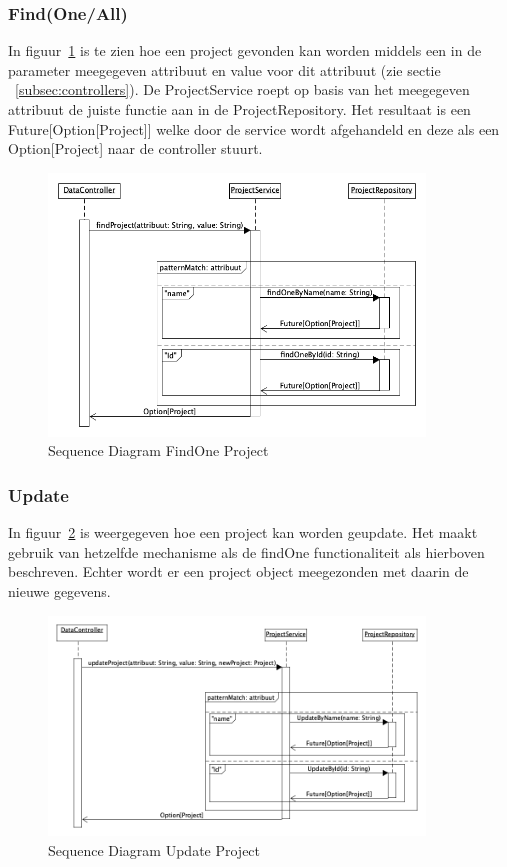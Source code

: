 \subsubsection*{Find(One/All)}
In figuur~\ref{fig:seqdiagFindProj} is te zien hoe een project gevonden kan worden middels een in de parameter meegegeven attribuut en value voor dit attribuut (zie sectie ~\ref{subsec:controllers}). De ProjectService roept op basis van het meegegeven attribuut de juiste functie aan in de ProjectRepository. Het resultaat is een Future[Option[Project]] welke door de service wordt afgehandeld en deze als een Option[Project] naar de controller stuurt.
\begin{figure}[h]
    \myfloatalign
    \includegraphics[width=10cm]{gfx/umlet/exports/CRUD-FindProject}
    \caption{Sequence Diagram FindOne Project }
    \label{fig:seqdiagFindProj}
\end{figure}
\subsubsection*{Update}
In figuur~\ref{fig:seqdiagUpdateProj} is weergegeven hoe een project kan worden geupdate. Het maakt gebruik van hetzelfde mechanisme als de findOne functionaliteit als hierboven beschreven. Echter wordt er een project object meegezonden met daarin de nieuwe gegevens.
\begin{figure}[h]
    \myfloatalign
    \includegraphics[width=10cm]{gfx/umlet/exports/CRUD-UpdateProject}
    \caption{Sequence Diagram Update Project }
    \label{fig:seqdiagUpdateProj}
\end{figure}
